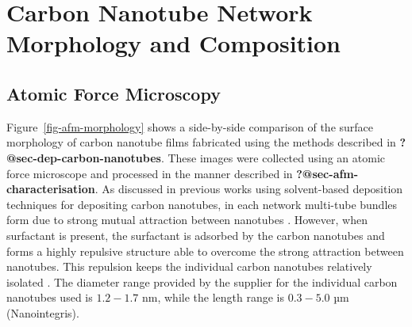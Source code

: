 \documentclass[
  a4paper,
]{scrbook}
\begin{document}
\hypertarget{sec-pristine-morphology}{%
\section{Carbon Nanotube Network Morphology and
Composition}\label{sec-pristine-morphology}}

\hypertarget{sec-pristine-AFM}{%
\subsection{Atomic Force Microscopy}\label{sec-pristine-AFM}}

Figure~\ref{fig-afm-morphology} shows a side-by-side comparison of the
surface morphology of carbon nanotube films fabricated using the methods
described in \textbf{?@sec-dep-carbon-nanotubes}. These images were
collected using an atomic force microscope and processed in the manner
described in \textbf{?@sec-afm-characterisation}. As discussed in
previous works using solvent-based deposition techniques for depositing
carbon nanotubes, in each network multi-tube bundles form due to strong
mutual attraction between nanotubes
\autocite{Zheng2017,Murugathas2018,Murugathas2019,Nguyen2021}. However,
when surfactant is present, the surfactant is adsorbed by the carbon
nanotubes and forms a highly repulsive structure able to overcome the
strong attraction between nanotubes. This repulsion keeps the individual
carbon nanotubes relatively isolated
\autocite{Wenseleers2004,Gavrel2013,Hermanson2013-16,Shimizu2013,DiCrescenzo2014,Yang2023}.
The diameter range provided by the supplier for the individual carbon
nanotubes used is \(1.2-1.7\) nm, while the length range is \(0.3-5.0\)
µm (Nanointegris).
\end{document}
